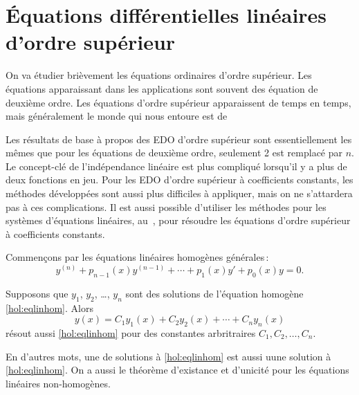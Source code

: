 \sectionnewpage
\section[EDO linéaires d'ordre supérieur]{Équations différentielles linéaires d'ordre supérieur} \label{sec:hol}


%

On va étudier brièvement les équations ordinaires d'ordre supérieur. Les équations apparaissant dans les applications sont souvent des équation de deuxième ordre. Les équations d'ordre supérieur apparaissent de temps en temps, mais généralement le monde qui nous entoure est de   

Les résultats de base à propos des EDO d'ordre supérieur sont essentiellement les mêmes que pour les équations de deuxième ordre, seulement 2 est remplacé par $n$.
Le concept-clé de l'indépendance linéaire est plus compliqué lorsqu'il y a plus de deux fonctions en jeu. Pour les EDO d'ordre supérieur à coefficients constants, les méthodes développées sont aussi plus difficiles à appliquer, mais on ne s'attardera pas à ces complications. Il est aussi possible d'utiliser les méthodes pour les systèmes d'équations linéaires, au~, pour résoudre les équations d'ordre supérieur à coefficients constants. 

Commençons par les équations linéaires homogènes générales\,: 
\begin{equation} \label{hol:eqlinhom}
y^{(n)} + p_{n-1}(x)y^{(n-1)} + \cdots + p_1(x) y' + p_0(x) y = 0 .
\end{equation}

\begin{theorem}[Superposition]
Supposons que $y_1$, $y_2$, \ldots, $y_n$ sont des solutions de l'équation homogène \eqref{hol:eqlinhom}.  Alors 
\begin{equation*}
y(x) = C_1 y_1(x) + C_2 y_2(x) + \cdots + C_n y_n(x) 
\end{equation*}
résout aussi \eqref{hol:eqlinhom}
pour des constantes arbritraires $C_1, C_2, \ldots, C_n$.
\end{theorem}

En d'autres mots, une \emph{} de solutions à \eqref{hol:eqlinhom}
est aussi uune solution à \eqref{hol:eqlinhom}.
On a aussi le théorème d'existance et d'unicité pour les équations linéaires non-homogènes. 

